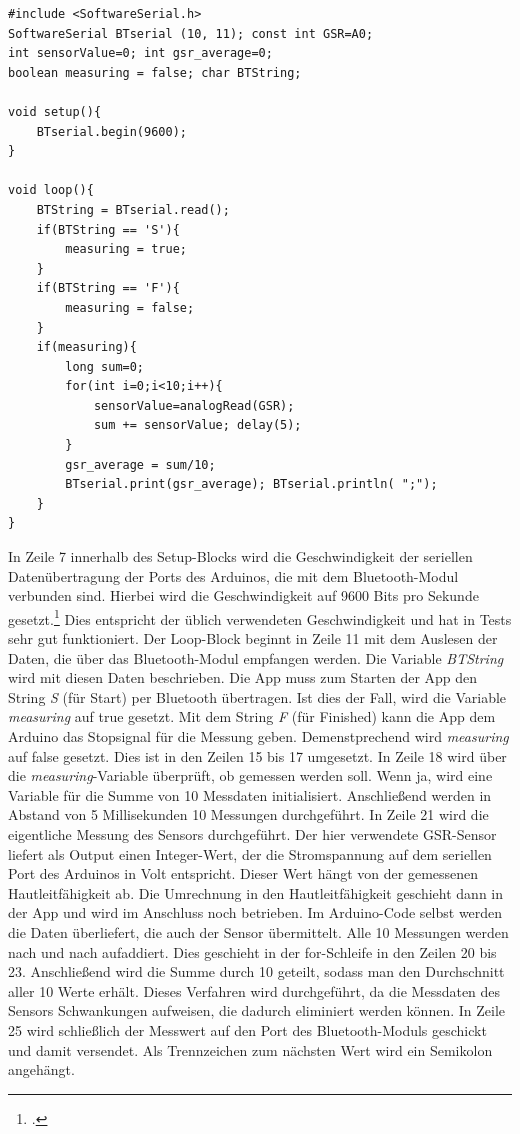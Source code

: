 \begin{lstlisting}[caption={Quellcode des Arduinos},style=Arduino]
#include <SoftwareSerial.h>
SoftwareSerial BTserial (10, 11); const int GSR=A0;
int sensorValue=0; int gsr_average=0;
boolean measuring = false; char BTString;

void setup(){
	BTserial.begin(9600);
}

void loop(){
	BTString = BTserial.read();
	if(BTString == 'S'){
		measuring = true;
	}
	if(BTString == 'F'){
		measuring = false;
	}
	if(measuring){
		long sum=0;
		for(int i=0;i<10;i++){ 
			sensorValue=analogRead(GSR);
			sum += sensorValue; delay(5);
		}
		gsr_average = sum/10;
		BTserial.print(gsr_average); BTserial.println( ";");
	}
}
\end{lstlisting}
In Zeile 7 innerhalb des Setup-Blocks wird die Geschwindigkeit der seriellen Datenübertragung der Ports des Arduinos, die mit dem Bluetooth-Modul verbunden sind. Hierbei wird die Geschwindigkeit auf 9600 Bits pro Sekunde gesetzt.\footcite[Vgl.][]{Ard18b} Dies entspricht der üblich verwendeten Geschwindigkeit und hat in Tests sehr gut funktioniert. \newline
Der Loop-Block beginnt in Zeile 11 mit dem Auslesen der Daten, die über das Bluetooth-Modul empfangen werden. Die Variable \textit{BTString} wird mit diesen Daten beschrieben. Die App muss zum Starten der App den String \textit{S} (für Start) per Bluetooth übertragen. Ist dies der Fall, wird die Variable \textit{measuring} auf true gesetzt. Mit dem String \textit{F} (für Finished) kann die App dem Arduino das Stopsignal für die Messung geben. Demenstprechend wird \textit{measuring} auf false gesetzt. Dies ist in den Zeilen 15 bis 17 umgesetzt. \newline
In Zeile 18 wird über die \textit{measuring}-Variable überprüft, ob gemessen werden soll. Wenn ja, wird eine Variable für die Summe von 10 Messdaten initialisiert. Anschließend werden in Abstand von 5 Millisekunden 10 Messungen durchgeführt. In Zeile 21 wird die eigentliche Messung des Sensors durchgeführt. Der hier verwendete GSR-Sensor liefert als Output einen Integer-Wert, der die Stromspannung auf dem seriellen Port des Arduinos in Volt entspricht. Dieser Wert hängt von der gemessenen Hautleitfähigkeit ab. Die Umrechnung in den Hautleitfähigkeit geschieht dann in der App und wird im Anschluss noch betrieben. Im Arduino-Code selbst werden die Daten überliefert, die auch der Sensor übermittelt.  Alle 10 Messungen werden nach und nach aufaddiert. Dies geschieht in der for-Schleife in den Zeilen 20 bis 23. Anschließend wird die Summe durch 10 geteilt, sodass man den Durchschnitt aller 10 Werte erhält. Dieses Verfahren wird durchgeführt, da die Messdaten des Sensors Schwankungen aufweisen, die dadurch eliminiert werden können. In Zeile 25 wird schließlich der Messwert auf den Port des Bluetooth-Moduls geschickt und damit versendet. Als Trennzeichen zum nächsten Wert wird ein Semikolon angehängt. \newline
